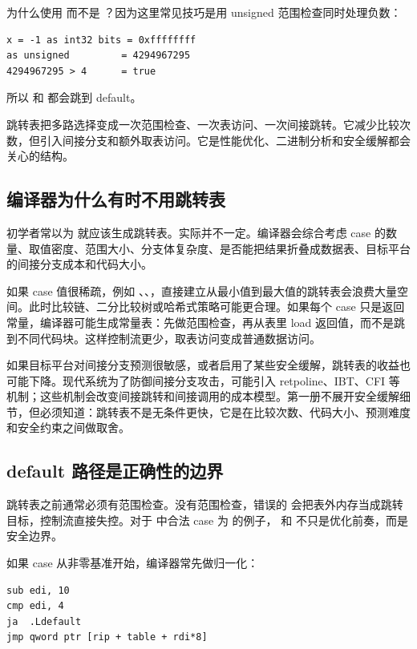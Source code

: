 为什么使用  而不是 ？因为这里常见技巧是用 unsigned 范围检查同时处理负数：

\begin{lstlisting}
x = -1 as int32 bits = 0xffffffff
as unsigned         = 4294967295
4294967295 > 4      = true
\end{lstlisting}

所以  和  都会跳到 default。

\begin{keyidea}
跳转表把多路选择变成一次范围检查、一次表访问、一次间接跳转。它减少比较次数，但引入间接分支和额外取表访问。它是性能优化、二进制分析和安全缓解都会关心的结构。
\end{keyidea}

\subsection{编译器为什么有时不用跳转表}

初学者常以为  就应该生成跳转表。实际并不一定。编译器会综合考虑 case 的数量、取值密度、范围大小、分支体复杂度、是否能把结果折叠成数据表、目标平台的间接分支成本和代码大小。

如果 case 值很稀疏，例如 、、，直接建立从最小值到最大值的跳转表会浪费大量空间。此时比较链、二分比较树或哈希式策略可能更合理。如果每个 case 只是返回常量，编译器可能生成常量表：先做范围检查，再从表里 load 返回值，而不是跳到不同代码块。这样控制流更少，取表访问变成普通数据访问。

如果目标平台对间接分支预测很敏感，或者启用了某些安全缓解，跳转表的收益也可能下降。现代系统为了防御间接分支攻击，可能引入 retpoline、IBT、CFI 等机制；这些机制会改变间接跳转和间接调用的成本模型。第一册不展开安全缓解细节，但必须知道：跳转表不是无条件更快，它是在比较次数、代码大小、预测难度和安全约束之间做取舍。

\subsection{default 路径是正确性的边界}

跳转表之前通常必须有范围检查。没有范围检查，错误的  会把表外内存当成跳转目标，控制流直接失控。对于  中合法 case 为  的例子， 和  不只是优化前奏，而是安全边界。

如果 case 从非零基准开始，编译器常先做归一化：

\begin{lstlisting}
sub edi, 10
cmp edi, 4
ja  .Ldefault
jmp qword ptr [rip + table + rdi*8]
\end{lstlisting}

